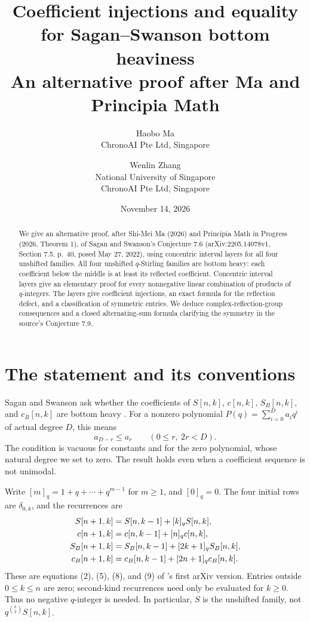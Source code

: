 \documentclass[11pt]{article}
\title{Coefficient injections and equality for Sagan--Swanson bottom heaviness\\
\large An alternative proof after Ma and Principia Math}
\author{Haobo Ma\\\small ChronoAI Pte Ltd, Singapore
\and Wenlin Zhang\\\small National University of Singapore\\\small ChronoAI Pte Ltd, Singapore}
\date{November 14, 2026}
\newcommand{\qi}[1]{[#1]_q}
\begin{document}
\maketitle
\begin{abstract}
We give an alternative proof, after Shi-Mei Ma (2026) and Principia
Math in Progress (2026, Theorem 1), of Sagan and Swanson's
Conjecture 7.6 (arXiv:2205.14078v1, Section 7.5, p.~40, posed
May 27, 2022), using concentric interval layers for all four unshifted families.
All four unshifted $q$-Stirling families are bottom heavy: each
coefficient below the middle is at least its reflected coefficient.
Concentric interval layers give an elementary proof for every
nonnegative linear combination of products of $q$-integers.
The layers give coefficient injections, an exact formula for the
reflection defect, and a classification of symmetric entries.
We deduce complex-reflection-group consequences and a closed
alternating-sum formula clarifying the symmetry in the source's Conjecture 7.9.
\end{abstract}

\section{The statement and its conventions}
Sagan and Swanson ask whether the coefficients of $S[n,k]$, $c[n,k]$,
$S_B[n,k]$, and $c_B[n,k]$ are bottom heavy \cite[Conjecture 7.6]{SS}.
For a nonzero polynomial $P(q)=\sum_{i=0}^D a_iq^i$ of actual degree $D$,
this means
\begin{equation}\label{eq:bh}
 a_{D-r}\le a_r\qquad(0\le r,\ 2r<D).
\end{equation}
The condition is vacuous for constants and for the zero polynomial,
whose natural degree we set to zero. The result holds even when a
coefficient sequence is not unimodal.

Write $\qi{m}=1+q+\cdots+q^{m-1}$ for $m\ge1$, and $\qi0=0$.
The four initial rows are $\delta_{0,k}$, and the recurrences are
\begin{align}
 S[n+1,k]&=S[n,k-1]+\qi{k}S[n,k],\notag\\
 c[n+1,k]&=c[n,k-1]+\qi{n}c[n,k],\label{eq:rec}\\
 S_B[n+1,k]&=S_B[n,k-1]+\qi{2k+1}S_B[n,k],\notag\\
 c_B[n+1,k]&=c_B[n,k-1]+\qi{2n+1}c_B[n,k].\notag
\end{align}
These are equations (2), (5), (8), and (9) of \cite{SS}'s first
arXiv version. Entries outside $0\le k\le n$ are zero; second-kind
recurrences need only be evaluated for $k\ge0$. Thus no negative
$q$-integer is needed. In particular, $S$ is the unshifted family,
not $q^{\binom{k}{2}}S[n,k]$.
\end{document}
